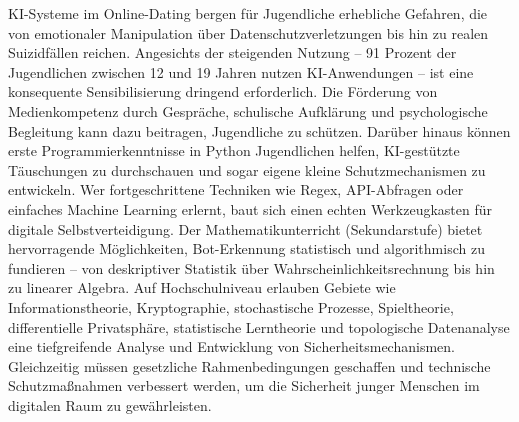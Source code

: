 \documentclass[12pt,a4paper,oneside]{scrartcl}
\begin{document}
	KI-Systeme im Online-Dating bergen für Jugendliche erhebliche Gefahren, die von emotionaler Manipulation über Datenschutzverletzungen bis hin zu realen Suizidfällen reichen. Angesichts der steigenden Nutzung – 91 Prozent der Jugendlichen zwischen 12 und 19 Jahren nutzen KI-Anwendungen \cite{JIM2025} – ist eine konsequente Sensibilisierung dringend erforderlich. Die Förderung von Medienkompetenz durch Gespräche, schulische Aufklärung und psychologische Begleitung kann dazu beitragen, Jugendliche zu schützen. Darüber hinaus können erste Programmierkenntnisse in Python Jugendlichen helfen, KI-gestützte Täuschungen zu durchschauen und sogar eigene kleine Schutzmechanismen zu entwickeln. Wer fortgeschrittene Techniken wie Regex, API-Abfragen oder einfaches Machine Learning erlernt, baut sich einen echten Werkzeugkasten für digitale Selbstverteidigung. Der Mathematikunterricht (Sekundarstufe) bietet hervorragende Möglichkeiten, Bot-Erkennung statistisch und algorithmisch zu fundieren – von deskriptiver Statistik über Wahrscheinlichkeitsrechnung bis hin zu linearer Algebra. Auf Hochschulniveau erlauben Gebiete wie Informationstheorie, Kryptographie, stochastische Prozesse, Spieltheorie, differentielle Privatsphäre, statistische Lerntheorie und topologische Datenanalyse eine tiefgreifende Analyse und Entwicklung von Sicherheitsmechanismen. Gleichzeitig müssen gesetzliche Rahmenbedingungen geschaffen und technische Schutzmaßnahmen verbessert werden, um die Sicherheit junger Menschen im digitalen Raum zu gewährleisten.
	
\end{document}
